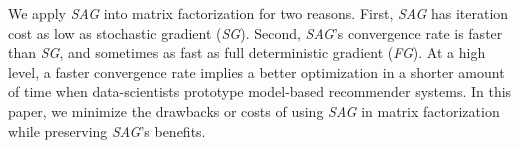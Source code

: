 We apply \emph{SAG} into matrix factorization for two reasons.
First, \emph{SAG} has iteration cost as low as stochastic gradient (\emph{SG}).
Second, \emph{SAG}'s convergence rate is faster than \emph{SG}, and sometimes as fast as full deterministic gradient (\emph{FG}).
At a high level, a faster convergence rate implies a better optimization in a shorter amount of time when data-scientists prototype model-based recommender systems.
In this paper, we minimize the drawbacks or costs of using \emph{SAG} in matrix factorization while preserving \emph{SAG}'s benefits.

